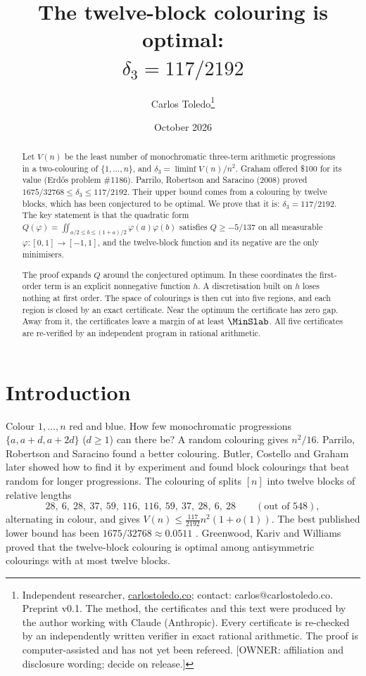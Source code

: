 \documentclass[11pt]{article}
\title{The twelve-block colouring is optimal:\\ $\delta_3=117/2192$}
\author{Carlos Toledo\thanks{Independent researcher, \href{https://carlostoledo.co}{carlostoledo.co}; contact: carlos@carlostoledo.co.
Preprint v0.1. The method, the certificates and this text were produced by the author working with Claude (Anthropic).
Every certificate is re-checked by an independently written verifier in exact rational arithmetic. The proof is
computer-assisted and has not yet been refereed. [OWNER: affiliation and disclosure wording; decide on release.]}}
\date{October 2026}
\newcommand{\vphi}{\varphi}
\begin{document}
\maketitle

\begin{abstract}
Let $V(n)$ be the least number of monochromatic three-term arithmetic progressions in a
two-colouring of $\{1,\dots,n\}$, and $\delta_3=\liminf V(n)/n^2$. Graham offered \$100 for its
value (Erd\H{o}s problem \#1186). Parrilo, Robertson and Saracino (2008) proved
$1675/32768\le\delta_3\le117/2192$. Their upper bound comes from a colouring by twelve blocks,
which has been conjectured to be optimal. We prove that it is:
$\delta_3=117/2192$. The key statement is that the quadratic form $Q(\vphi)=\iint_{a/2\le b\le(1+a)/2}\vphi(a)\vphi(b)$
satisfies $Q\ge-5/137$ on all measurable $\vphi:[0,1]\to[-1,1]$, and the twelve-block function and its
negative are the only minimisers.

The proof expands $Q$ around the conjectured optimum. In these coordinates the first-order
term is an explicit nonnegative function $h$. A discretisation built on $h$ loses nothing at
first order. The space of colourings is then cut into five regions, and each region is closed by
an exact certificate. Near the optimum the certificate has zero gap. Away from it, the
certificates leave a margin of at least $\MinSlab$. All five certificates are re-verified by an
independent program in rational arithmetic.
\end{abstract}

\section{Introduction}
Colour $1,\dots,n$ red and blue. How few monochromatic progressions $\{a,a+d,a+2d\}$ ($d\ge1$)
can there be? A random colouring gives $n^2/16$. Parrilo, Robertson and Saracino \cite{PRS} found
a better colouring. Butler, Costello and Graham \cite{BCG} later showed how to find it by experiment
and found block colourings that beat random for longer progressions. The colouring of \cite{PRS}
splits $[n]$ into twelve blocks of relative lengths
\[28,\ 6,\ 28,\ 37,\ 59,\ 116,\ 116,\ 59,\ 37,\ 28,\ 6,\ 28\qquad(\text{out of }548),\]
alternating in colour, and gives $V(n)\le\frac{117}{2192}n^2(1+o(1))$. The best published lower
bound has been $1675/32768\approx0.0511$ \cite{PRS}. Greenwood, Kariv and Williams \cite{GKW} proved that the
twelve-block colouring is optimal among antisymmetric colourings with at most twelve blocks.
\end{document}
